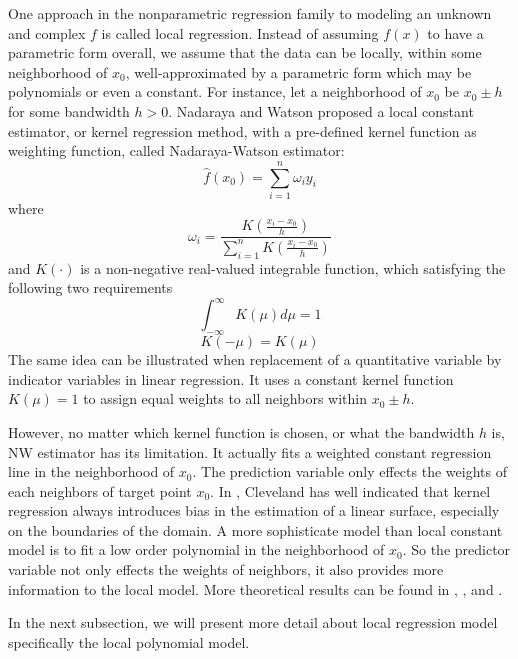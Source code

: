 One approach in the nonparametric regression family to modeling an unknown and
complex $f$ is called local regression. Instead of assuming 
$f(x)$ to have a parametric form overall, we assume that the data can be locally, 
within some neighborhood of $x_0$, well-approximated by a parametric form which 
may be polynomials or even a constant. For instance, let a neighborhood of $x_0$ 
be $x_0 \pm h$ for some bandwidth $h > 0$.
Nadaraya \cite{nadaraya1964} and Watson \cite{watson1964} proposed a local 
constant estimator, or kernel regression method, with a pre-defined kernel 
function as weighting function, called Nadaraya-Watson estimator:
\begin{equation} 
\hat f(x_0) = \sum_{i=1}^{n} \omega_{i}y_i
\end{equation} 
where 
\begin{equation} 
\omega_i = \frac{ K(\frac{x_i - x_0}{h})}{\sum_{i=1}^n K(\frac{x_i - x_0}{h})}
\end{equation} 
and $K(\cdot)$ is a non-negative real-valued integrable function, which satisfying 
the following two requirements
\begin{equation} 
\int_{-\infty}^{\infty} K(\mu)d\mu = 1
\end{equation} 
\begin{equation} 
K(-\mu) = K(\mu)
\end{equation}
The same idea can be illustrated when replacement of a quantitative variable by
indicator variables in linear regression. It uses a constant kernel function 
$K(\mu) = 1$ to assign equal weights to all neighbors within $x_0 \pm h$. 

However, no matter which kernel function is chosen, or what the bandwidth $h$ is,
NW estimator has its limitation. It actually fits a weighted constant regression
line in the neighborhood of $x_0$. The prediction variable only effects the weights
of each neighbors of target point $x_0$. In \cite{cleveland1988regression}, 
Cleveland has well indicated that kernel regression always introduces bias in the
estimation of a linear surface, especially on the boundaries of the domain. A more 
sophisticate model than local constant model is to fit a low order polynomial in 
the neighborhood of $x_0$. So the 
predictor variable not only effects the weights of neighbors, it also provides more
information to the local model. More theoretical results can be found in 
\cite{fan1992design}, \cite{fan1993local}, and \cite{hastie1993varying}.

In the next subsection, we will present more detail
about local regression model specifically the local polynomial model.


